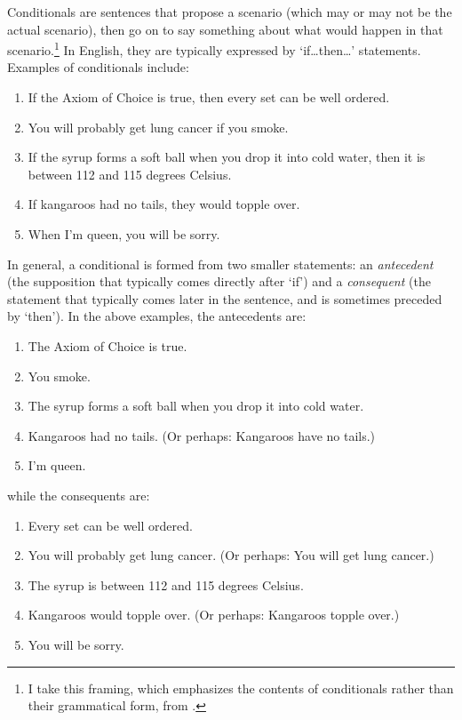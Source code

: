 Conditionals are sentences that propose a scenario (which may or may not be the actual scenario), then go on to say something about what would happen in that scenario.\footnote{I take this framing, which emphasizes the contents of conditionals rather than their grammatical form, from \citep{fintel:conditionals}.}  In English, they are typically expressed by `if\ldots then\ldots' statements.  Examples of conditionals include:
\begin{enumerate}
\item If the Axiom of Choice is true, then every set can be well ordered.
\item You will probably get lung cancer if you smoke.
\item If the syrup forms a soft ball when you drop it into cold water, then it is between 112 and 115 degrees Celsius.
\item If kangaroos had no tails, they would topple over.
\item When I'm queen, you will be sorry.
\end{enumerate}

In general, a conditional is formed from two smaller statements: an \emph{antecedent} (the supposition that typically comes directly after `if') and a \emph{consequent} (the statement that typically comes later in the sentence, and is sometimes preceded by `then').  In the above examples, the antecedents are:
%
\begin{enumerate}
\item The Axiom of Choice is true.
\item You smoke.
\item The syrup forms a soft ball when you drop it into cold water.
\item Kangaroos had no tails.  (Or perhaps: Kangaroos have no tails.)
\item I'm queen.
\end{enumerate}
%
while the consequents are:
%
\begin{enumerate}
\item Every set can be well ordered.
\item You will probably get lung cancer.  (Or perhaps: You will get lung cancer.)
\item The syrup is between 112 and 115 degrees Celsius.
\item Kangaroos would topple over.  (Or perhaps: Kangaroos topple over.)
\item You will be sorry.
\end{enumerate}


